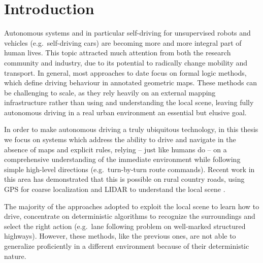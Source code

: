 \chapter{Introduction}

Autonomous systems and in particular self-driving for unsupervised robots and vehicles (e.g.\ self-driving cars) are becoming more and more integral part of human lives. This topic attracted much attention from both the research community and industry, due to its potential to radically change mobility and transport. In general, most approaches to date focus on formal logic methods, which define driving behaviour in annotated geometric maps. These methods can be challenging to scale, as they rely heavily on an external mapping infrastructure rather than using and understanding the local scene, leaving fully autonomous driving in a real urban environment an essential but elusive goal.

\cite{kendall}
In order to make autonomous driving a truly ubiquitous technology, in this thesis we focus on systems which address the ability to drive and navigate in the absence of maps and explicit rules, relying – just like humans do – on a comprehensive understanding of the immediate environment while following simple high-level directions (e.g.\ turn-by-turn route commands). Recent work in this area has demonstrated that this is possible on rural country roads, using GPS for coarse localization and LIDAR to understand the local scene \cite{ort2018autonomous}.

The majority of the approaches adopted to exploit the local scene to learn how to drive, concentrate on deterministic algorithms to recognize the surroundings and select the right action (e.g.\ lane following problem on well-marked structured highways). However, these methods, like the previous ones, are not able to generalize proficiently in a different environment because of their deterministic nature.

